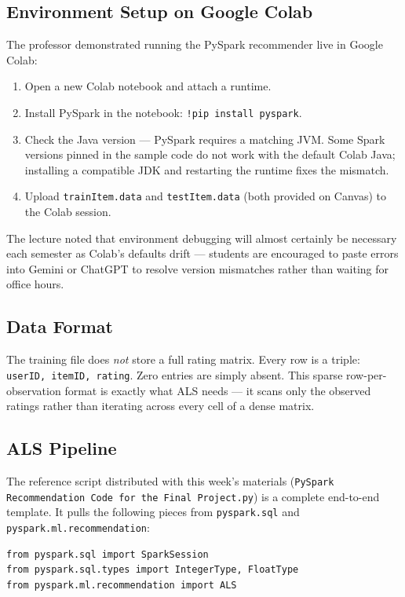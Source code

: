 \documentclass[11pt]{article}
\begin{document}
\subsection{Environment Setup on Google Colab}
The professor demonstrated running the PySpark recommender live in Google Colab:
\begin{enumerate}
    \item Open a new Colab notebook and attach a runtime.
    \item Install PySpark in the notebook: \texttt{!pip install pyspark}.
    \item Check the Java version --- PySpark requires a matching JVM. Some Spark versions pinned in the sample code do not work with the default Colab Java; installing a compatible JDK and restarting the runtime fixes the mismatch.
    \item Upload \texttt{trainItem.data} and \texttt{testItem.data} (both provided on Canvas) to the Colab session.
\end{enumerate}
The lecture noted that environment debugging will almost certainly be necessary each semester as Colab's defaults drift --- students are encouraged to paste errors into Gemini or ChatGPT to resolve version mismatches rather than waiting for office hours.

\subsection{Data Format}
The training file does \emph{not} store a full rating matrix. Every row is a triple: \texttt{userID, itemID, rating}. Zero entries are simply absent. This sparse row-per-observation format is exactly what ALS needs --- it scans only the observed ratings rather than iterating across every cell of a dense matrix.

\subsection{ALS Pipeline}
The reference script distributed with this week's materials (\texttt{PySpark Recommendation Code for the Final Project.py}) is a complete end-to-end template. It pulls the following pieces from \texttt{pyspark.sql} and \texttt{pyspark.ml.recommendation}:
\begin{verbatim}
from pyspark.sql import SparkSession
from pyspark.sql.types import IntegerType, FloatType
from pyspark.ml.recommendation import ALS
\end{verbatim}
\end{document}
